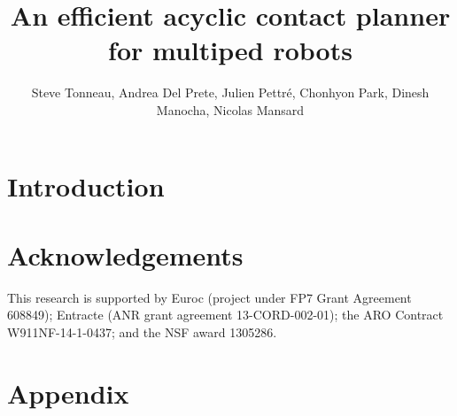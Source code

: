 \documentclass[shortAfour,sageh]{sagej}
\begin{document}

\title{An efficient acyclic contact planner for multiped robots}

\author{Steve Tonneau, Andrea Del Prete, Julien Pettr\'e, Chonhyon Park, Dinesh Manocha, Nicolas Mansard}



\begin{abstract}
	
\end{abstract}


\maketitle

\section{Introduction}






\section*{Acknowledgements}
This research is supported by Euroc (project under FP7 Grant Agreement  608849);  Entracte (ANR  grant  agreement  13-CORD-002-01);
the ARO Contract W911NF-14-1-0437; and the NSF award 1305286. %

\appendix
\section*{Appendix}



\glsaddall
\printglossaries


\appendix



\end{document}
